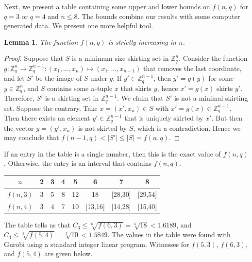 \documentclass[12pt,reqno]{article}
\newtheorem{lm}[thm]{Lemma}
\newcommand{\ZZ}{\mathbb Z}
\begin{document}
Next, we present a table containing some upper and lower bounds on $f(n,q)$ for $q = 3$ or $q=4$ and $n \leq 8$.
The bounds combine our results with some computer generated data.
We present one more helpful tool.

\begin{lm}
 \label{Lm:Increasing}
 The function $f(n,q)$ is strictly increasing in $n$.
\end{lm}

\begin{proof}
 Suppose that $S$ is a minimum size skirting set in $\ZZ_q^n$.
 Consider the function $g: \ZZ_q^n \to \ZZ_q^{n-1}: (x_1, \dots, x_n) \mapsto (x_1, \dots, x_{n-1})$ that removes the last coordinate, and let $S'$ be the image of $S$ under $g$.
 If $y' \in \ZZ_q^{n-1}$, then $y' = g(y)$ for some $y \in \ZZ_q^n$, and $S$ contains some $n$-tuple $x$ that skirts $y$, hence $x' = g(x)$ skirts $y'$.
 Therefore, $S'$ is a skirting set in $\ZZ_q^{n-1}$.
 We claim that $S'$ is not a minimal skirting set.
 Suppose the contrary.
 Take $x = (x',x_n) \in S$ with $x' = g(x) \in \ZZ_q^{n-1}$.
 Then there exists an element $y' \in \ZZ_q^{n-1}$ that is uniquely skirted by $x'$.
 But then the vector $y=(y',x_n)$ is not skirted by $S$, which is a contradiction.
 Hence we may conclude that $f(n-1,q) < |S'| \leq |S| = f(n,q)$.
\end{proof}

If an entry in the table is a single number, then this is the exact value of $f(n,q)$.
Otherwise, the entry is an interval that contains $f(n,q)$.

\begin{table}[h]
 \centering
 \begin{tabular}{c | c c c c c c c}
  $n$ & 2 & 3 & 4 & 5 & 6 & 7 & 8 \\ \hline
  $f(n,3)$ & 3 & 5 & 8 & 12 & 18 & [28,30] & [29,54] \\ 
  $f(n,4)$ & 3 & 4 & 7 & 10 & [13,16] & [14,28] & [15,40]
 \end{tabular}
\end{table}

The table tells us that $C_3 \leq \sqrt[6]{f(6,3)} = \sqrt[6]{18} < 1.6189$, and $C_4 \leq \sqrt[5]{f(5,4)} = \sqrt[5]{10} < 1.5849$. 
The values in the table were found with Gurobi using a standard integer linear program.
Witnesses for $f(5, 3)$, $f(6, 3)$, and $f(5, 4)$ are given below.
\end{document}
